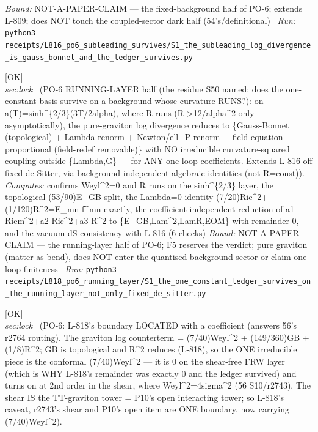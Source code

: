 \begin{description}
 \emph{Bound:} NOT-A-PAPER-CLAIM --- the fixed-background half of PO-6; extends L-809; does NOT touch the coupled-sector dark half (54's/definitional)
\ \emph{Run:} \texttt{python3 receipts/L816\_po6\_subleading\_survives/S1\_the\_subleading\_log\_divergence\_is\_gauss\_bonnet\_and\_the\_ledger\_survives.py}
\item[\label{rcpt:S1_the_one_constant_ledger_survives_on_the_running_layer_not_only_fixed_de_sitter}\texttt{S1\_the\_one\_constant\_ledger\_survives\_on\_the\_running\_layer\_not\_only\_fixed\_de\_sitter}]\hfill\textsf{[OK]}\\
\textit{sec:lock} \ (PO-6 RUNNING-LAYER half (the residue S50 named: does the one-constant basis survive on a background whose curvature RUNS?): on a(T)=sinh\textasciicircum{}\{2/3\}(3T/2alpha), where R runs (R->12/alpha\textasciicircum{}2 only asymptotically), the pure-graviton log divergence reduces to \{Gauss-Bonnet (topological) + Lambda-renorm + Newton/ell\_P-renorm + field-equation-proportional (field-redef removable)\} with NO irreducible curvature-squared coupling outside \{Lambda,G\} --- for ANY one-loop coefficients. Extends L-816 off fixed de Sitter, via background-independent algebraic identities (not R=const)). 
\emph{Computes:} confirms Weyl\textasciicircum{}2=0 and R runs on the sinh\textasciicircum{}\{2/3\} layer, the topological (53/90)E\_GB split, the Lambda=0 identity (7/20)Ric\textasciicircum{}2+(1/120)R\textasciicircum{}2=E\_mn f\textasciicircum{}mn exactly, the coefficient-independent reduction of a1 Riem\textasciicircum{}2+a2 Ric\textasciicircum{}2+a3 R\textasciicircum{}2 to \{E\_GB,Lam\textasciicircum{}2,LamR,EOM\} with remainder 0, and the vacuum-dS consistency with L-816 (6 checks)
 \emph{Bound:} NOT-A-PAPER-CLAIM --- the running-layer half of PO-6; F5 reserves the verdict; pure graviton (matter as bend), does NOT enter the quantised-background sector or claim one-loop finiteness
\ \emph{Run:} \texttt{python3 receipts/L818\_po6\_running\_layer/S1\_the\_one\_constant\_ledger\_survives\_on\_the\_running\_layer\_not\_only\_fixed\_de\_sitter.py}
\item[\label{rcpt:S1_the_ledgers_one_irreducible_survivor_is_the_conformal_coupling_that_turns_on_at_the_shear}\texttt{S1\_the\_ledgers\_one\_irreducible\_survivor\_is\_the\_conformal\_coupling\_that\_turns\_on\_at\_the\_shear}]\hfill\textsf{[OK]}\\
\textit{sec:lock} \ (PO-6: L-818's boundary LOCATED with a coefficient (answers 56's r2764 routing). The graviton log counterterm = (7/40)Weyl\textasciicircum{}2 + (149/360)GB + (1/8)R\textasciicircum{}2; GB is topological and R\textasciicircum{}2 reduces (L-818), so the ONE irreducible piece is the conformal (7/40)Weyl\textasciicircum{}2 --- it is 0 on the shear-free FRW layer (which is WHY L-818's remainder was exactly 0 and the ledger survived) and turns on at 2nd order in the shear, where Weyl\textasciicircum{}2=4sigma\textasciicircum{}2 (56 S10/r2743). The shear IS the TT-graviton tower = P10's open interacting tower; so L-818's caveat, r2743's shear and P10's open item are ONE boundary, now carrying (7/40)Weyl\textasciicircum{}2). 

\end{description}
